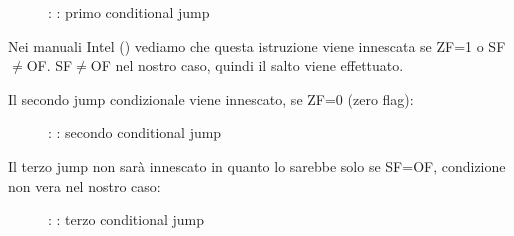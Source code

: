 \begin{figure}[H]
\centering
{}
\caption{\olly: : primo conditional jump}
\label{fig:jcc_olly_signed_1}
\end{figure}

Nei manuali Intel () vediamo che questa istruzione viene innescata se ZF=1 o SF$\neq$OF.
SF$\neq$OF nel nostro caso, quindi il salto viene effettuato.

\clearpage
Il secondo jump condizionale \JNZ viene innescato, se ZF=0 (zero flag):

\begin{figure}[H]
\centering
{}
\caption{\olly: : secondo conditional jump}
\label{fig:jcc_olly_signed_2}
\end{figure}

\clearpage
Il terzo jump \JGE non sarà innescato in quanto lo sarebbe solo se SF=OF, condizione non vera nel nostro caso:

\begin{figure}[H]
\centering
{}
\caption{\olly: : terzo conditional jump}
\label{fig:jcc_olly_signed_3}
\end{figure}
